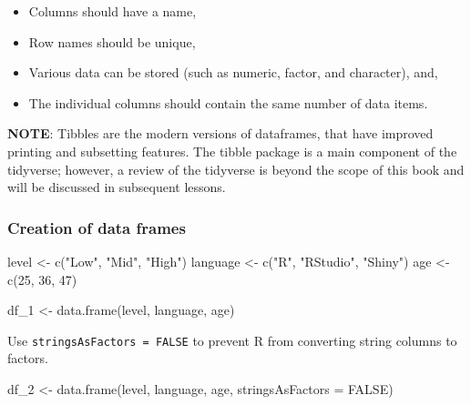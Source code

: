 \documentclass[
  letterpaper,
  DIV=11,
  numbers=noendperiod]{scrreprt}
\newenvironment{Shaded}{}{}
\newcommand{\AttributeTok}[1]{\textcolor[rgb]{0.84,0.23,0.29}{#1}}
\newcommand{\ConstantTok}[1]{\textcolor[rgb]{0.00,0.36,0.77}{#1}}
\newcommand{\DecValTok}[1]{\textcolor[rgb]{0.00,0.36,0.77}{#1}}
\newcommand{\FunctionTok}[1]{\textcolor[rgb]{0.44,0.26,0.76}{#1}}
\newcommand{\NormalTok}[1]{\textcolor[rgb]{0.14,0.16,0.18}{#1}}
\newcommand{\OtherTok}[1]{\textcolor[rgb]{0.44,0.26,0.76}{#1}}
\newcommand{\StringTok}[1]{\textcolor[rgb]{0.01,0.18,0.38}{#1}}
\providecommand{\tightlist}{%
  \setlength{\itemsep}{0pt}\setlength{\parskip}{0pt}}\usepackage{longtable,booktabs,array}
\begin{document}
\begin{itemize}
\tightlist
\item
  Columns should have a name,
\item
  Row names should be unique,
\item
  Various data can be stored (such as numeric, factor, and character),
  and,
\item
  The individual columns should contain the same number of data items.
\end{itemize}

\textbf{NOTE}: Tibbles are the modern versions of dataframes, that have
improved printing and subsetting features. The tibble package is a main
component of the tidyverse; however, a review of the tidyverse is beyond
the scope of this book and will be discussed in subsequent lessons.

\subsubsection{Creation of data frames}\label{creation-of-data-frames}

\begin{Shaded}
\begin{Highlighting}[]
\NormalTok{level }\OtherTok{\textless{}{-}} \FunctionTok{c}\NormalTok{(}\StringTok{"Low"}\NormalTok{, }\StringTok{"Mid"}\NormalTok{, }\StringTok{"High"}\NormalTok{)}
\NormalTok{language }\OtherTok{\textless{}{-}} \FunctionTok{c}\NormalTok{(}\StringTok{"R"}\NormalTok{, }\StringTok{"RStudio"}\NormalTok{, }\StringTok{"Shiny"}\NormalTok{)}
\NormalTok{age }\OtherTok{\textless{}{-}} \FunctionTok{c}\NormalTok{(}\DecValTok{25}\NormalTok{, }\DecValTok{36}\NormalTok{, }\DecValTok{47}\NormalTok{)}
\end{Highlighting}
\end{Shaded}

\begin{Shaded}
\begin{Highlighting}[]
\NormalTok{df\_1 }\OtherTok{\textless{}{-}} \FunctionTok{data.frame}\NormalTok{(level, language, age)}
\end{Highlighting}
\end{Shaded}

Use \texttt{stringsAsFactors\ =\ FALSE} to prevent R from converting
string columns to factors.

\begin{Shaded}
\begin{Highlighting}[]
\NormalTok{df\_2 }\OtherTok{\textless{}{-}} \FunctionTok{data.frame}\NormalTok{(level, language, age, }\AttributeTok{stringsAsFactors =} \ConstantTok{FALSE}\NormalTok{)}
\end{Highlighting}
\end{Shaded}
\end{document}
